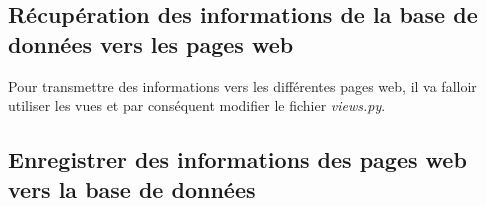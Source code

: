 
\subsection{Récupération des informations de la base de données vers les pages web}

Pour transmettre des informations vers les différentes pages web, il va falloir utiliser les vues et par conséquent modifier le fichier \textit{views.py}.

\subsection{Enregistrer des informations des pages web vers la base de données}

